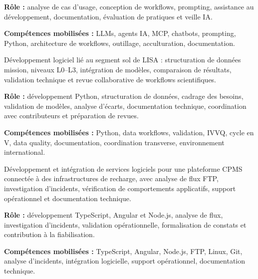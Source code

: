 \documentclass[8pt,a4paper,ragged2e,withhyper]{altacv}
\begin{document}
\textbf{Rôle :} analyse de cas d’usage, conception de workflows, prompting, assistance au développement, documentation, évaluation de pratiques et veille IA.

\textbf{Compétences mobilisées :} LLMs, agents IA, MCP, chatbots, prompting, Python, architecture de workflows, outillage, acculturation, documentation.

\divider


Développement logiciel lié au segment sol de LISA : structuration de données mission, niveaux L0--L3, intégration de modèles, comparaison de résultats, validation technique et revue collaborative de workflows scientifiques.

\textbf{Rôle :} développement Python, structuration de données, cadrage des besoins, validation de modèles, analyse d’écarts, documentation technique, coordination avec contributeurs et préparation de revues.

\textbf{Compétences mobilisées :} Python, data workflows, validation, IVVQ, cycle en V, data quality, documentation, coordination transverse, environnement international.

\divider


Développement et intégration de services logiciels pour une plateforme CPMS connectée à des infrastructures de recharge, avec analyse de flux FTP, investigation d’incidents, vérification de comportements applicatifs, support opérationnel et documentation technique.

\textbf{Rôle :} développement TypeScript, Angular et Node.js, analyse de flux, investigation d’incidents, validation opérationnelle, formalisation de constats et contribution à la fiabilisation.

\textbf{Compétences mobilisées :} TypeScript, Angular, Node.js, FTP, Linux, Git, analyse d’incidents, intégration logicielle, support opérationnel, documentation technique.


\vspace{-.3cm}

\end{document}
